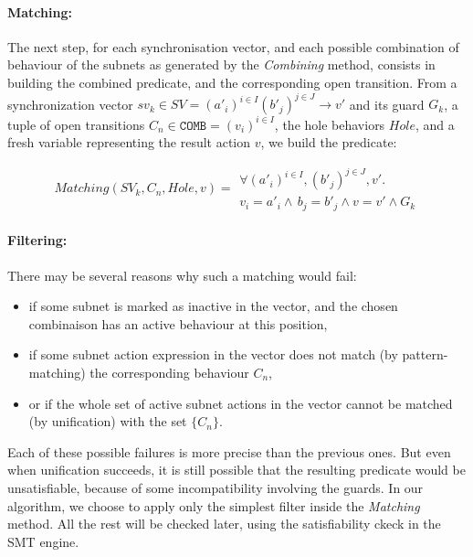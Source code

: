 \documentclass{lncs/llncs}
\begin{document}
\paragraph{Matching:}
The next step, for each synchronisation vector, and each possible
combination of behaviour of the subnets as generated by the \emph
{Combining} method, consists in building the combined predicate,
and the corresponding open transition.
From a synchronization vector
$sv_k\in SV = (a'_i)^{i\in I} (b'_j)^{j\in J}\rightarrow v'$
and its guard $G_k$, a tuple of open transitions
$C_n\in \texttt{COMB} = {(v_i)}^{i\in I}$, the hole behaviors $Hole$,
and a fresh variable representing the result action $v$, we build the
predicate: 

$$Matching(SV_k, C_n, Hole, v) = 
\begin{array}{l}
\forall {(a'_i)}^{i\in I},
{(b'_j)}^{j\in J},v'.
\\
v_i=a'_i\land \, b_j=b'_j \land v=v' \land G_k
\end{array}$$

\paragraph{Filtering:}
There may be several reasons why such a matching would fail:
\begin{itemize}
  \item if some subnet is marked as inactive in the vector, and the
    chosen combinaison has an active behaviour at this position,
  \item if some subnet action expression in the vector does not match (by
    pattern-matching) the corresponding behaviour $C_n$,
  \item or if the whole set of active subnet actions in the vector
    cannot be matched (by unification) with the set $\{C_n\}$.
\end {itemize}

Each of these possible failures is more precise than the previous
ones. But even when unification succeeds, it is still possible that
the resulting predicate would be unsatisfiable, because of some
incompatibility involving the guards. In our algorithm, we choose to
apply only the simplest filter inside the \emph{Matching} method. All
the rest will be checked later, using the satisfiability ckeck in the
SMT engine.
\end{document}
